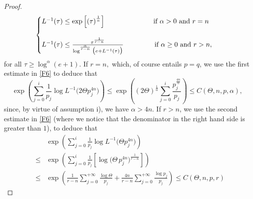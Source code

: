 \documentclass[12pt]{amsart}
\theoremstyle{definition}
\numberwithin{equation}{section}
\numberwithin{equation}{section}
\begin{document}
{\begin{proof}
\begin{equation}
    \begin{cases}
L^{-1}(\tau)\le \exp\left[\left(\tau\right)^{{\frac{1}{\alpha }}}\right]\qquad\qquad\qquad \quad \text{if}\,\,\alpha>0\,\, \text{and}\,\, r=n\cr\cr
L^{-1}(\tau)\le \frac{\tau^{\frac{1}{r-n}}}{\log^{^{{\frac{\alpha }{r-n}}}}\big(e+L^{-1}(\tau)\big)} \qquad\qquad\,\,\, \text{if}\,\,\alpha\ge 0\,\, \text{and}\,\, r>n,
\end{cases}\end{equation}
 for all $\tau \ge \log^\alpha(e+1)$.
If $r=n,$ which, of course entails $p = q$, we use the first estimate in \eqref{F6}  to deduce that
$$\exp\left(\sum_{j=0}^i \frac{1}{p_j}\log{{L}^{-1} \Big({2} \Theta p_j^{4n}\Big)}\right)\le \exp\left(\left({2} \Theta \right)^{{\frac{1}{\alpha }}}\sum_{j=0}^i \frac{p_j^{{\frac{4n}{\alpha }}}}{p_j}\right) \le C(\Theta,n,p,\alpha), $$
since, by virtue of assumption i), we have ${\alpha>4n}$. If $r>n$, we use the second estimate in \eqref{F6} {(where we notice that the denominator in the right hand side is greater than $1$)}, to deduce that
{
\begin{eqnarray*}
    && \exp\left(\sum_{j=0}^i \frac{1}{p_j}\log{{L}^{-1} \Big(\Theta p_j^{4n}\Big)}\right)\\
    &\le& \exp\left(\sum_{j=0}^i \frac{1}{p_j}\left [\log{ \Big(\Theta \, p_j^{4n}\Big)^{\frac{1}{r - n}}} \right ] \right) \\
    &\le & \exp\left( \frac{1}{r - n}\sum_{j=0}^{+ \infty}  \frac{\log \Theta}{p_j} + \frac{4n}{r-n}  \sum_{j=0}^{+ \infty}    
    \frac{\log p_j}{p_j} \right )\le C(\Theta,n,p,r)
\end{eqnarray*}
    }


\end{proof}}
\end{document}
